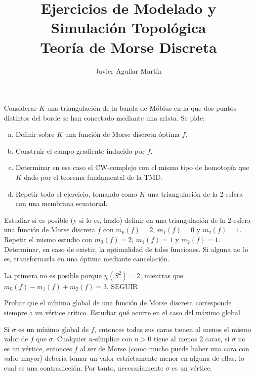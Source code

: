 \documentclass[twoside]{article}
\begin{document}
\title{Ejercicios de Modelado y Simulación Topológica\\ Teoría de Morse Discreta}
\author{Javier Aguilar Martín}
\maketitle

\begin{ejercicio}{1}
Considerar $K$ una triangulación de la banda de Möbius en la que dos puntos distintos del borde se han conectado mediante una arista. Se pide:
\begin{enumerate}[(a)]
\item Definir sobre $K$ una función de Morse discreta óptima $f$.
\item Construir el campo gradiente inducido por $f$. 
\item Determinar en ese caso el CW-complejo con el mismo tipo de homotopía que $K$ dado por el teorema fundamental de la TMD. 
\item Repetir todo el ejercicio, tomando como $K$ una triangulación de la 2-esfera con una membrana ecuatorial. 
\end{enumerate}
\end{ejercicio}
\begin{solucion}

\end{solucion}
\newpage

\begin{ejercicio}{2}
Estudiar si es posible (y si lo es, hazlo) definir en una triangulación de la 2-esfera una función de Morse discreta $f$ con $m_0(f)=2$, $m_1(f)=0$ y $m_2(f)=1$. Repetir el mismo estudio con $m_0(f)=2$, $m_1(f)=1$ y $m_2(f)=1$. Determinar, en caso de existir, la optimalidad de tales funciones. Si alguna no lo es, transformarla en una óptima mediante cancelación. 
\end{ejercicio}
\begin{solucion}
La primera no es posible porque $\chi(S^2)=2$, mientras que $m_0(f)-m_1(f)+m_2(f)=3$. SEGUIR
\end{solucion}

\newpage

\begin{ejercicio}{3}
Probar que el mínimo global de una función de Morse discreta corresponde siempre a un vértice crítico. Estudiar qué ocurre en el caso del máximo global.
\end{ejercicio}
\begin{solucion}
Si $\sigma$ es un mínimo global de $f$, entonces todas sus caras tienen al menos el mismo valor de $f$ que $\sigma$. Cualquier $n$-símplice con $n>0$ tiene al menos 2 caras, si $\sigma$ no es un vértice, entonces $f$ al ser de Morse (como mucho puede haber una cara con valor mayor) debería tomar un valor estrictamente menor en alguna de ellas, lo cual es una contradicción. Por tanto, necesariamente $\sigma$ es un vértice. 
\end{solucion}
\end{document}
